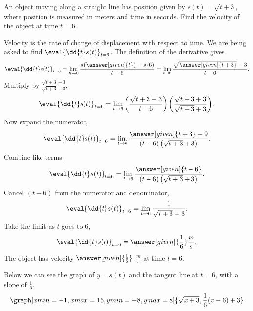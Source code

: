 \documentclass{ximera}
\begin{document}
\begin{example}
  An object moving along a straight line has position given by
  $s(t) = \sqrt{t+3}$, where position is measured in meters and time in seconds.  Find the velocity of the object at time $t=6$.
  \begin{explanation}
    Velocity is the rate of change of displacement with respect to
    time.  We are being asked to find $\eval{\dd{t} s(t)}_{t=6}$.  The
    definition of the derivative gives
    \[
    \eval{\dd{t} s(t)}_{t=6} = \lim_{h \to 0} \frac{s\left(\answer[given]{t}\right)-s\left(6\right)}{t-6} = \lim_{t\to 6} \frac{\sqrt{\answer[given]{t+3}}-3}{t-6}.
    \]
    Multiply by $\frac{\sqrt{t+3}+3}{\sqrt{t+3}+3}$,
    \[
    \eval{\dd{t} s(t)}_{t=6} = \lim_{t\to 6} \left(\frac{\sqrt{t+3}-3}{t-6} \right)\left(\frac{\sqrt{t+3}+3}{\sqrt{t+3}+3} \right).
    \]		
    Now expand the numerator,
    \[
    \eval{\dd{t} s(t)}_{t=6} = \lim_{t \to 6} \frac{\answer[given]{t+3} - 9}{(t-6)\left(\sqrt{t+3}+3 \right)}.
    \]
    Combine like-terms,
    \[
    \eval{\dd{t} s(t)}_{t=6} = \lim_{t \to 6} \frac{\answer[given]{t-6}}{(t-6)\left(\sqrt{t+3}+3\right)}.
    \]
    Cancel $(t-6)$ from the numerator and denominator,
    \[
    \eval{\dd{t} s(t)}_{t=6} = \lim_{t\to 6} \frac{1}{\sqrt{t+3}+3}.
    \]
    Take the limit as $t$ goes to $6$,
    \[
    \eval{\dd{t} s(t)}_{t=6} = \answer[given]{\frac{1}{6}} \frac{m}{s}.
    \]
    The object has velocity $\answer[given]{\frac{1}{6}}$ $\frac{m}{s}$ at time $t=6$.
	\begin{onlineOnly}
	Below we can see the graph of $y=s(t)$ and the tangent line at $t=6$, with a slope of $\frac{1}{6}$. 
	\[
	\graph[xmin=-1,xmax=15,ymin=-8,ymax=8]{\sqrt{x+3}, \frac{1}{6}(x-6)+3}
	\]
	\end{onlineOnly}
	\end{explanation}
\end{example}
\end{document}
